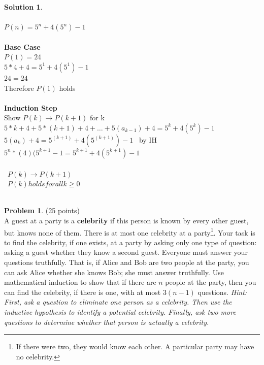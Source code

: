 \documentclass{article}
\theoremstyle{definition}
\newtheorem{problem}{Problem}
\newtheorem*{solution}{Solution}
\begin{document}
\begin{solution}\ \\
\ \\
$P(n) = 5^n + 4(5^n) - 1$\ \\
\ \\
\textbf{Base Case}\ \\
$P(1) = 24$\ \\
$5*4 + 4 = 5^1 + 4(5^1)-1$\ \\
$24 = 24 $ \ \ \checkmark \ \\
Therefore $P(1)$ holds\ \\
\ \\
\textbf{Induction Step}\ \\ 
Show  $P(k) \xrightarrow{} P(k+1)$ for k \ \\
$5*k+4 + 5*(k+1)+4 + \dots + 5(a_{k-1})+4 = 5^k+4(5^k)-1$ \ \\
$5(a_{k})+4 = 5^(k+1)+4(5^(k+1))-1$ \ by IH\ \\
$5^n*(4)(5^{k+1}-1 = 5^{k+1}+4(5^{k+1})-1 $\ \ \checkmark\ \\
\ \\
\therefore \ $P(k) \xrightarrow{} P(k+1)$\ \\
\therefore \ $P(k) holds for all k \geq 0$\ \\
\ \\
\end{solution}

\newpage

\begin{problem} (25 points)\\
A guest at a party is a \textbf{celebrity} if this person is known by every other guest, but knows none of them. 
There is at most one celebrity at a party\footnote{If there were two, they
would know each other. A particular party may have no celebrity.}. 
Your task is to find the celebrity, if one exists, at a party by asking only one type of question:
asking a guest whether they know a second guest.
Everyone must answer your questions truthfully.
That is, if Alice and Bob are two people at the party, you can ask Alice whether she knows Bob; 
she must answer truthfully.
Use mathematical induction to show that if there are $n$ people at the party, then you can find the celebrity, if there is one, with at most $3(n-1)$ questions. 
\textit{Hint: First, ask a question to eliminate one person as a celebrity. 
Then use the inductive hypothesis to identify a potential celebrity.
Finally, ask two more questions to determine whether that person is actually a celebrity.} 
\end{problem}
\end{document}
